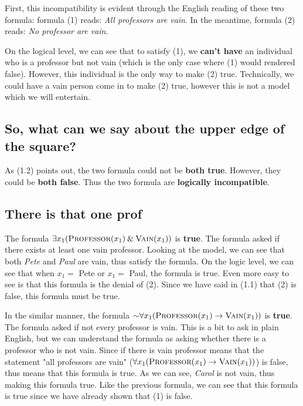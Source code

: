 \documentclass{article}
\begin{document}
First, this incompatibility is evident through the English reading of these two formula: formula (1) reads: \textit{All professors are vain}. In the meantime, formula (2) reads: \textit{No professor are vain}.

On the logical level, we can see that to satisfy (1), we \textbf{can't have} an individual who is a professor but not vain (which is the only case where (1) would rendered false). However, this individual is the only way to make (2) true. Technically, we could have a vain person come in to make (2) true, however this is not a model which we will entertain.

\subsection{So, what can we say about the upper edge of the square?}
As (1.2) points out, the two formula could not be \textbf{both true}. However, they could be \textbf{both false}. Thus the two formula are \textbf{logically incompatible}. 

\subsection{There is that one prof}
The formula  $\exists x_1 (\textsc{Professor}(x_1)\mathbin{\&} \textsc{Vain}(x_1))$ is \textbf{true}. The formula asked if there exists at least one vain professor. Looking at the model, we can see that both \textit{Pete} and \textit{Paul} are vain, thus satisfy the formula. On the logic level, we can see that when $x_1 = $ Pete or $x_1 = $ Paul, the formula is true. Even more easy to see is that this formula is the denial of (2). Since we have said in (1.1) that (2) is false, this formula must be true.

In the similar manner, the formula $\mathord{\sim} \forall x_1 (\textsc{Professor}(x_1)\rightarrow \textsc{Vain}(x_1))$ is \textbf{true}. The formula asked if not every professor is vain. This is a bit to ask in plain English, but we can understand the formula as asking whether there is a professor who is not vain. Since if there is vain professor means that the statement "all professors are vain" ($\forall x_1 (\textsc{Professor}(x_1)\rightarrow \textsc{Vain}(x_1))$) is false, thus means that this formula is true. As we can see, \textit{Carol} is not vain, thus making this formula true. Like the previous formula, we can see that this formula is true since we have already shown that (1) is false.  
\end{document}
